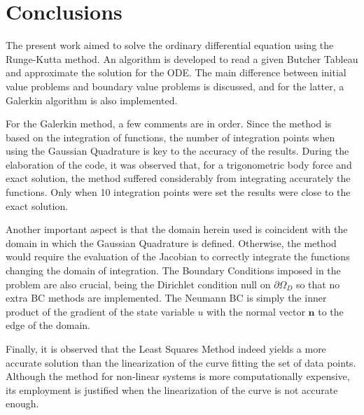 \section{Conclusions}\label{sec:conclusions}
The present work aimed to solve the ordinary differential equation using the Runge-Kutta method. An algorithm is developed to read a given Butcher Tableau and approximate the solution for the ODE. The main difference between initial value problems and boundary value problems is discussed, and for the latter, a Galerkin algorithm is also implemented.

For the Galerkin method, a few comments are in order. Since the method is based on the integration of functions, the number of integration points when using the Gaussian Quadrature is key to the accuracy of the results. During the elaboration of the code, it was observed that, for a trigonometric body force and exact solution, the method suffered considerably from integrating accurately the functions. Only when 10 integration points were set the results were close to the exact solution. 

Another important aspect is that the domain herein used is coincident with the domain in which the Gaussian Quadrature is defined. Otherwise, the method would require the evaluation of the Jacobian to correctly integrate the functions changing the domain of integration. The Boundary Conditions imposed in the problem are also crucial, being the Dirichlet condition null on $\partial \Omega_D$ so that no extra BC methods are implemented. The Neumann BC is simply the inner product of the gradient of the state variable $u$ with the normal vector $\bm{n}$ to the edge of the domain. 

Finally, it is observed that the Least Squares Method indeed yields a more accurate solution than the linearization of the curve fitting the set of data points. Although the method for non-linear systems is more computationally expensive, its employment is justified when the linearization of the curve is not accurate enough.